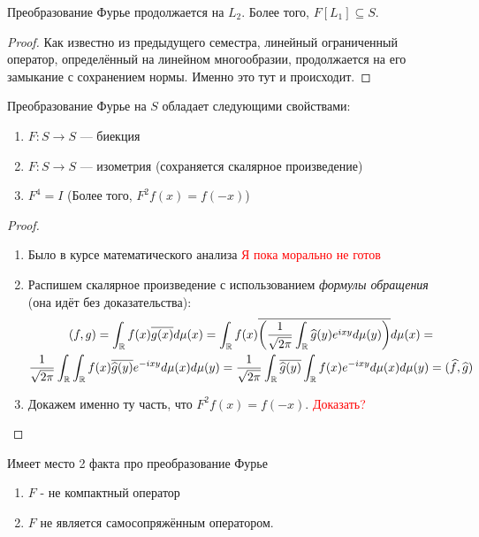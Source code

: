 \begin{proposition}
	Преобразование Фурье продолжается на $L_2$. Более того, $F[L_1] \subseteq S$.
\end{proposition}

\begin{proof}
	Как известно из предыдущего семестра, линейный ограниченный оператор, определённый на линейном многообразии, продолжается на его замыкание с сохранением нормы. Именно это тут и происходит.
\end{proof}

\begin{proposition}
	Преобразование Фурье на $S$ обладает следующими свойствами:
	\begin{enumerate}
		\item $F \colon S \to S$ --- биекция
		
		\item $F \colon S \to S$ --- изометрия (сохраняется скалярное произведение)
		
		\item $F^4 = I$ (Более того, $F^2f(x) = f(-x)$)
	\end{enumerate}
\end{proposition}

\begin{proof}~
	\begin{enumerate}
		\item Было в курсе математического анализа \textcolor{red}{Я пока морально не готов}
		
		\item Распишем скалярное произведение с использованием \textit{формулы обращения} (она идёт без доказательства):
		\begin{multline*}
			(f, g) = \int_{\mathbb{R}} f(x)\overline{g(x)}d\mu(x) = \int_{\mathbb{R}} f(x)\overline{\left(\frac{1}{\sqrt{2\pi}}\int_{\mathbb{R}} \widehat{g}(y)e^{ixy}d\mu(y)\right)}d\mu(x) =
			\\
			\frac{1}{\sqrt{2\pi}} \int_{\mathbb{R}} \int_{\mathbb{R}} f(x)\overline{\widehat{g}(y)}e^{-ixy}d\mu(x)d\mu(y) = \frac{1}{\sqrt{2\pi}} \int_{\mathbb{R}} \overline{\widehat{g}(y)} \int_{\mathbb{R}} f(x)e^{-ixy}d\mu(x)d\mu(y) = (\widehat{f}, \widehat{g})
		\end{multline*}
		
		\item Докажем именно ту часть, что $F^2f(x) = f(-x)$. \textcolor{red}{Доказать?}
	\end{enumerate}
\end{proof}

\begin{corollary}
	Имеет место 2 факта про преобразование Фурье
	\begin{enumerate}
		\item $F$ - не компактный оператор
		
		\item $F$ не является самосопряжённым оператором.
	\end{enumerate}
\end{corollary}

